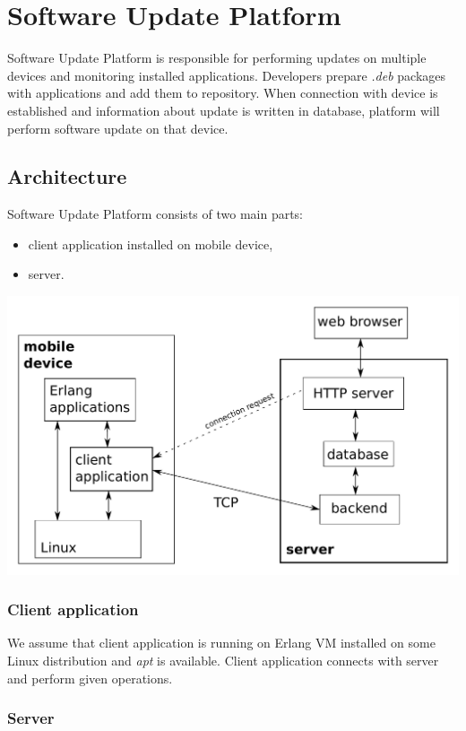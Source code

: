 \section{Software Update Platform}

Software Update Platform is responsible for performing updates on multiple devices and monitoring
installed applications. Developers prepare \emph{.deb} packages with applications and add them to
repository. When connection with device is established and information about update is written in
database, platform will perform software update on that device.


\subsection{Architecture}

Software Update Platform consists of two main parts:
\begin{itemize}
  \item client application installed on mobile device,
  \item server.
\end{itemize}

\includegraphics[width=\textwidth]{graphics/architecture.pdf}


\subsubsection*{Client application}

We assume that client application is running on Erlang VM installed on some Linux distribution and
\emph{apt} is available. Client application connects with server and perform given operations.


\subsubsection*{Server}


